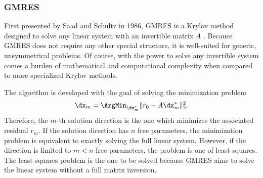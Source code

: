 \subsubsection{GMRES}
First presented by Saad and Schultz in 1986, GMRES is a Krylov method designed to solve any linear system with an invertible matrix $A$ \cite{saad_gmres_1986}.
Because GMRES does not require any other special structure, it is well-suited for generic, unsymmetrical problems.
Of course, with the power to solve any invertible system comes a burden of mathematical and computational complexity when compared to more specialized Krylov methods.

The algorithm is developed with the goal of solving the minimization problem
\begin{equation}
    \dx_m = \ArgMin_{\dx_m^*} \|r_0 - A \dx_m^*\|_2^2.
    \label{Eqn:GMRESMinimization}
\end{equation}
Therefore, the $m$-th solution direction is the one which minimizes the associated residual $r_m$.
If the solution direction has $n$ free parameters, the minimization problem is equivalent to exactly solving the full linear system.
However, if the direction is limited to $m < n$ free parameters, the problem is one of least squares.
The least squares problem is the one to be solved because GMRES aims to solve the linear system without a full matrix inversion.

